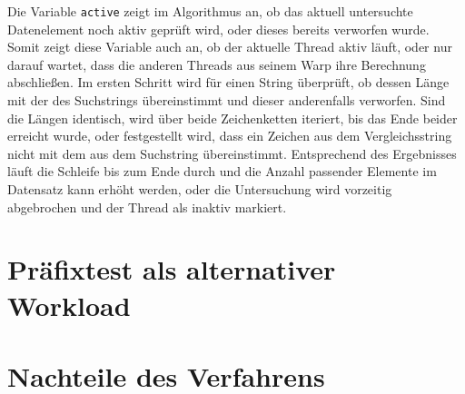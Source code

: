 Die Variable \texttt{active} zeigt im Algorithmus an, ob das aktuell untersuchte Datenelement noch aktiv geprüft wird, oder dieses bereits verworfen wurde.
Somit zeigt diese Variable auch an, ob der aktuelle Thread aktiv läuft, oder nur darauf wartet, dass die anderen Threads aus seinem Warp ihre Berechnung abschließen.
Im ersten Schritt wird für einen String überprüft, ob dessen Länge mit der des Suchstrings übereinstimmt und dieser anderenfalls verworfen.
Sind die Längen identisch, wird über beide Zeichenketten iteriert, bis das Ende beider erreicht wurde, oder festgestellt wird, dass ein Zeichen aus dem Vergleichsstring nicht mit dem aus dem Suchstring übereinstimmt.
Entsprechend des Ergebnisses läuft die Schleife bis zum Ende durch und die Anzahl passender Elemente im Datensatz kann erhöht werden, oder die Untersuchung wird vorzeitig abgebrochen und der Thread als inaktiv markiert.


\section{Präfixtest als alternativer Workload}

\section{Nachteile des Verfahrens}